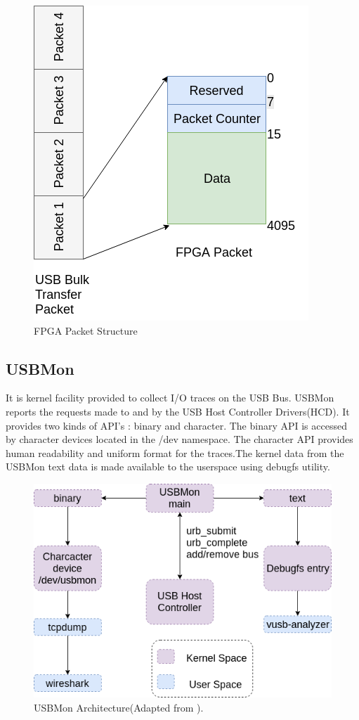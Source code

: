 \begin{figure}[h!]
\centering
\includegraphics[scale=0.6]{Figure/FPGA_Packet.png}
\caption{FPGA Packet Structure}
\label{fpga_packet}
\end{figure}




\subsection{USBMon}
It is kernel facility provided to collect I/O traces on the USB Bus\cite{_usbmon}. USBMon reports the requests made to and by the USB Host Controller Drivers(HCD). It provides two kinds of API's : binary and character. The binary API is accessed by character devices located in the /dev namespace. The character API provides human readability and uniform format for the traces.The kernel data from the USBMon text data is made available to the userspace using debugfs\cite{_debugfs} utility.

\begin{figure}[h!]
\centering
\includegraphics[width=\textwidth]{Figure/USBMon.png}
\caption{USBMon Architecture(Adapted from \cite{basak_usb_2018}).}
\end{figure}

